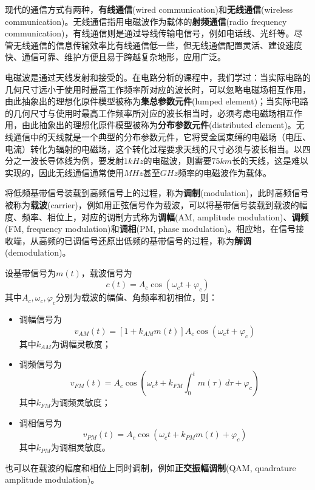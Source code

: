 \documentclass{ctexbook}
\begin{document}
现代的通信方式有两种\cite{electronic_circuits}，\textbf{有线通信}(wired communication)和\textbf{无线通信}(wireless communication)。无线通信指用电磁波作为载体的\textbf{射频通信}(radio frequency communication)，有线通信则是通过导线传输电信号，例如电话线、光纤等。尽管无线通信的信息传输效率比有线通信低一些，但无线通信配置灵活、建设速度快、通信可靠、维护方便且易于跨越复杂地形，应用广泛。

电磁波是通过天线发射和接受的。在电路分析的课程中，我们学过：当实际电路的几何尺寸远小于使用时最高工作频率所对应的波长时，可以忽略电磁场相互作用，由此抽象出的理想化原件模型被称为\textbf{集总参数元件}(lumped element)；当实际电路的几何尺寸与使用时最高工作频率所对应的波长相当时，必须考虑电磁场相互作用，由此抽象出的理想化原件模型被称为\textbf{分布参数元件}(distributed element)。无线通信中的天线就是一个典型的分布参数元件，它将受金属束缚的电磁场（电压、电流）转化为辐射的电磁场，这个转化过程要求天线的尺寸必须与波长相当。以四分之一波长导体线为例，要发射$1kHz$的电磁波，则需要$75km$长的天线，这是难以实现的，因此无线通信通常使用$MHz$甚至$GHz$频率的电磁波作为载体。

将低频基带信号装载到高频信号上的过程，称为\textbf{调制}(modulation)，此时高频信号被称为\textbf{载波}(carrier)，例如用正弦信号作为载波，可以将基带信号装载到载波的幅度、频率、相位上，对应的调制方式称为\textbf{调幅}(AM, amplitude modulation)、\textbf{调频}(FM, frequency modulation)和\textbf{调相}(PM, phase modulation)。相应地，在信号接收端，从高频的已调信号还原出低频的基带信号的过程，称为\textbf{解调}(demodulation)。
\begin{definition}[调频、调幅、调相]
    设基带信号为$m(t)$，载波信号为\[c(t)=A_c \cos(\omega_c t+\varphi_c)\]
    其中$A_c,\omega_c,\varphi_c$分别为载波的幅值、角频率和初相位，则：
    \begin{itemize}
        \item 调幅信号为\[v_{AM}(t)=[1+k_{AM} m(t)]A_c \cos(\omega_c t+\varphi_c)\]其中$k_{AM}$为调幅灵敏度；
        \item 调频信号为\[v_{FM}(t)=A_c \cos\left(\omega_c t+k_{FM}\int_{0}^{t}m(\tau)\,d\tau+\varphi_c\right)\]其中$k_{FM}$为调频灵敏度；
        \item 调相信号为\[v_{PM}(t)=A_c \cos\left(\omega_c t+k_{PM} m(t)+\varphi_c\right)\]其中$k_{PM}$为调相灵敏度。
    \end{itemize}
\end{definition}
也可以在载波的幅度和相位上同时调制，例如\textbf{正交振幅调制}(QAM, quadrature amplitude modulation)。
\end{document}
